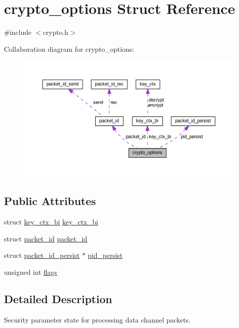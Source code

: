 \hypertarget{structcrypto__options}{}\section{crypto\+\_\+options Struct Reference}
\label{structcrypto__options}


{\ttfamily \#include $<$crypto.\+h$>$}



Collaboration diagram for crypto\+\_\+options\+:
\nopagebreak
\begin{figure}[H]
\begin{center}
\leavevmode
\includegraphics[width=350pt]{structcrypto__options__coll__graph}
\end{center}
\end{figure}
\subsection*{Public Attributes}
\begin{DoxyCompactItemize}
\item 
struct \hyperlink{structkey__ctx__bi}{key\+\_\+ctx\+\_\+bi} \hyperlink{structcrypto__options_a6f5aaea8aa6f397a0684d8b0a2879252}{key\+\_\+ctx\+\_\+bi}
\item 
struct \hyperlink{structpacket__id}{packet\+\_\+id} \hyperlink{structcrypto__options_ab4b7f20d49e1ac2efb9faf4a13d3701d}{packet\+\_\+id}
\item 
struct \hyperlink{structpacket__id__persist}{packet\+\_\+id\+\_\+persist} $\ast$ \hyperlink{structcrypto__options_a64268b2eac664d85f5e6133264f937ce}{pid\+\_\+persist}
\item 
unsigned int \hyperlink{structcrypto__options_a4f1cebf03b32cf2f3b44e90630079e88}{flags}
\end{DoxyCompactItemize}


\subsection{Detailed Description}
Security parameter state for processing data channel packets. 

